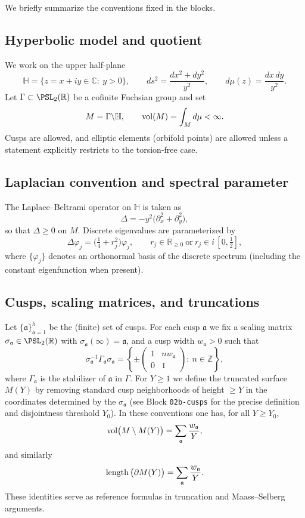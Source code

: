 We briefly summarize the conventions fixed in the blocks.

\subsection{Hyperbolic model and quotient}\label{subsec:prelim-hyp}

We work on the upper half-plane
\[
  \mathbb H=\{z=x+iy\in\mathbb C:\ y>0\},
  \qquad
  ds^{2}=\frac{dx^{2}+dy^{2}}{y^{2}},
  \qquad
  d\mu(z)=\frac{dx\,dy}{y^{2}}.
\]
Let $\Gamma\subset\PSL_{2}(\mathbb R)$ be a cofinite Fuchsian group and set
\[
  M=\Gamma\backslash \mathbb H,
  \qquad
  \mathop{\mathrm{vol}}\nolimits(M)=\int_{M} d\mu <\infty.
\]
Cusps are allowed, and elliptic elements (orbifold points) are allowed unless a
statement explicitly restricts to the torsion-free case.

\subsection{Laplacian convention and spectral parameter}\label{subsec:prelim-laplacian}

The Laplace--Beltrami operator on $\mathbb H$ is taken as
\[
  \Delta = -y^{2}\big(\partial_{x}^{2}+\partial_{y}^{2}\big),
\]
so that $\Delta\ge 0$ on $M$.  Discrete eigenvalues are parameterized by
\[
  \Delta \varphi_j = \Big(\tfrac14+r_j^{2}\Big)\varphi_j,
  \qquad
  r_j\in\mathbb R_{\ge 0}\ \text{or}\ r_j\in i\,[0,\tfrac12],
\]
where $\{\varphi_j\}$ denotes an orthonormal basis of the discrete spectrum
(including the constant eigenfunction when present).

\subsection{Cusps, scaling matrices, and truncations}\label{subsec:prelim-cusps}

Let $\{\mathfrak a\}_{\mathfrak a=1}^{h}$ be the (finite) set of cusps.
For each cusp $\mathfrak a$ we fix a scaling matrix $\sigma_{\mathfrak a}\in\PSL_{2}(\mathbb R)$
with $\sigma_{\mathfrak a}(\infty)=\mathfrak a$, and a cusp width $w_{\mathfrak a}>0$ such that
\[
  \sigma_{\mathfrak a}^{-1}\Gamma_{\mathfrak a}\sigma_{\mathfrak a}
  =
  \left\{\pm
  \begin{pmatrix}1 & n w_{\mathfrak a}\\ 0 & 1\end{pmatrix}:\ n\in\mathbb Z\right\},
\]
where $\Gamma_{\mathfrak a}$ is the stabilizer of $\mathfrak a$ in $\Gamma$.
For $Y\ge 1$ we define the truncated surface $M(Y)$ by removing standard cusp neighborhoods
of height $\ge Y$ in the coordinates determined by the $\sigma_{\mathfrak a}$ (see
Block \texttt{02b-cusps} for the precise definition and disjointness threshold $Y_{0}$).
In these conventions one has, for all $Y\ge Y_{0}$,
\begin{equation}\label{eq:cusp-tail-volume}
  \mathop{\mathrm{vol}}\nolimits\!\big(M\setminus M(Y)\big)=\sum_{\mathfrak a}\frac{w_{\mathfrak a}}{Y},
\end{equation}
and similarly
\[
  \mathop{\mathrm{length}}\nolimits\big(\partial M(Y)\big)=\sum_{\mathfrak a}\frac{w_{\mathfrak a}}{Y}.
\]
These identities serve as reference formulas in truncation and Maass--Selberg arguments.

